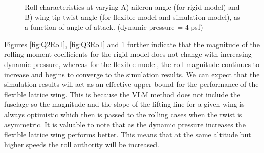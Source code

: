 \documentclass[11pt]{ucthesis}
\begin{document}
\begin{figure}
\hfill
{}
\hfill
{}
\hfill
\caption{Roll characteristics at varying A) aileron angle (for rigid model) and B) wing tip twist angle (for flexible model and simulation model), as a function of angle of attack. (dynamic pressure = 4 psf)}
\label{fig:Q4Roll}
\end{figure}

Figures \ref{fig:Q2Roll}, \ref{fig:Q3Roll} and \ref{fig:Q4Roll} further indicate that the magnitude of the rolling moment coefficients for the rigid model does not change with increasing dynamic pressure, whereas for the flexible model, the roll magnitude continues to increase and begins to converge to the simulation results. We can expect that the simulation results will act as an effective upper bound for the performance of the flexible lattice wing. This is because the VLM method does not include the fuselage so the magnitude and the slope of the lifting line for a given wing is always optimistic which then is passed to the rolling cases when the twist is asymmetric. It is valuable to note that as the dynamic pressure increases the flexible lattice wing performs better. This means that at the same altitude but higher speeds the roll authority will be increased.
\end{document}
